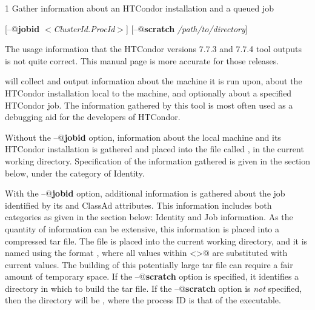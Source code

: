 \begin{ManPage}{\label{man-condor-gather-info}}{1}
{Gather information about an HTCondor installation and a queued job}
\Synopsis

[\verb@--@\textbf{jobid} \textit{$<$ClusterId.ProcId$>$}]
[\verb@--@\textbf{scratch} \textit{/path/to/directory}]


\Description

\Note  The usage information that the 
HTCondor versions 7.7.3 and 7.7.4  tool outputs
is not quite correct.
This manual page is more accurate for those releases.

 will collect and output information 
about the machine it is run upon,
about the HTCondor installation local to the machine, 
and optionally about a specified HTCondor job. 
The information gathered by this tool is most often used as a debugging aid
for the developers of HTCondor.

Without the \verb@--@\textbf{jobid} option, information about the
local machine and its HTCondor installation is gathered and
placed into the file called ,
in the current working directory. 
Specification of the information gathered is given in 
the  section below, 
under the category of Identity.

With the \verb@--@\textbf{jobid} option, 
additional information is gathered about the job identified by
its  and  ClassAd attributes.
This information includes both categories as given in
the  section below:
Identity and Job information.
As the quantity of information can be extensive,
this information is placed into a compressed tar file.
The file is placed into the current working directory,
and it is named using the format
, where all values within \verb@<>@ are substituted
with current values.
The building of this potentially large tar file can require a fair
amount of temporary space.
If the \verb@--@\textbf{scratch} option is specified,
it identifies a directory in which to build the tar file.
If the \verb@--@\textbf{scratch} option is \emph{not} specified, 
then the directory will be ,
where the process ID is that of the  executable.



\end{ManPage}
